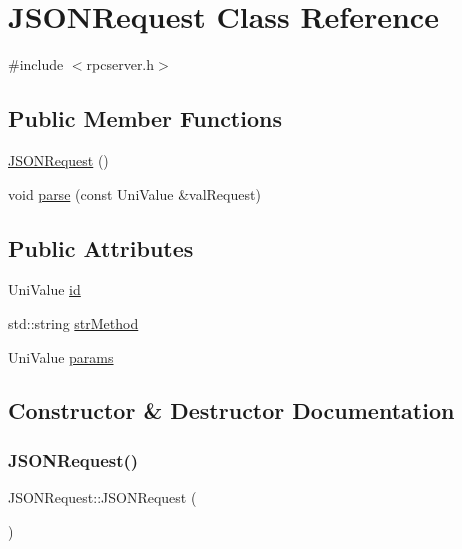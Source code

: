 \hypertarget{class_j_s_o_n_request}{}\section{J\+S\+O\+N\+Request Class Reference}
\label{class_j_s_o_n_request}


{\ttfamily \#include $<$rpcserver.\+h$>$}

\subsection*{Public Member Functions}
\begin{DoxyCompactItemize}
\item 
\mbox{\hyperlink{class_j_s_o_n_request_a2ce474cfc3eaec1ec8186e7625a2cceb}{J\+S\+O\+N\+Request}} ()
\item 
void \mbox{\hyperlink{class_j_s_o_n_request_a728d6b823679ab6466c127402f940eea}{parse}} (const Uni\+Value \&val\+Request)
\end{DoxyCompactItemize}
\subsection*{Public Attributes}
\begin{DoxyCompactItemize}
\item 
Uni\+Value \mbox{\hyperlink{class_j_s_o_n_request_a718f01139a587532dad68351941a8c37}{id}}
\item 
std\+::string \mbox{\hyperlink{class_j_s_o_n_request_ae29a3e3644f1807c85fcbb1a2d760aec}{str\+Method}}
\item 
Uni\+Value \mbox{\hyperlink{class_j_s_o_n_request_ae5820a9e4683722804d572223d2fb860}{params}}
\end{DoxyCompactItemize}


\subsection{Constructor \& Destructor Documentation}
\mbox{\label{class_j_s_o_n_request_a2ce474cfc3eaec1ec8186e7625a2cceb}} 
\subsubsection{\texorpdfstring{J\+S\+O\+N\+Request()}{JSONRequest()}}
{\footnotesize\ttfamily J\+S\+O\+N\+Request\+::\+J\+S\+O\+N\+Request (\begin{DoxyParamCaption}{ }\end{DoxyParamCaption})\hspace{0.3cm}{\ttfamily [inline]}}



